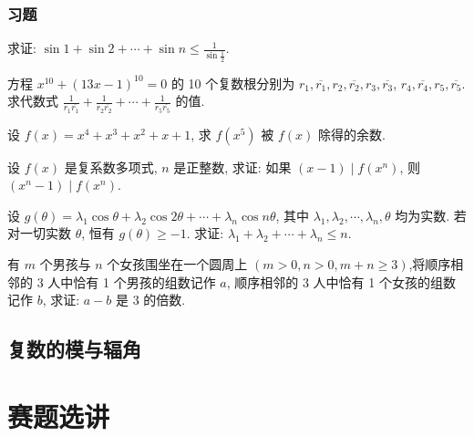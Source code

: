 \subsubsection{习题}
\begin{exercise}
	求证: $\sin 1+\sin 2+\cdots+\sin n \leqslant \frac{1}{\sin \frac{1}{2}}$.
\end{exercise}

\begin{exercise}
	方程 $x^{10}+(13 x-1)^{10}=0$ 的 10 个复数根分别为 $r_1, \overline{r_1}, r_2, \overline{r_2}, r_3, \overline{r_3}$, $r_4, \overline{r_4}, r_5, \overline{r_5}$. 求代数式 $\frac{1}{r_1 \overline{r_1}}+\frac{1}{r_2 \overline{r_2}}+\cdots+\frac{1}{r_5 \overline{r_5}}$ 的值.
\end{exercise}

\begin{exercise}
	设 $f(x)=x^4+x^3+x^2+x+1$, 求 $f\left(x^5\right)$ 被 $f(x)$ 除得的余数.
\end{exercise}

\begin{exercise}
	设 $f(x)$ 是复系数多项式, $n$ 是正整数, 求证: 如果 $(x-1) \mid f\left(x^n\right)$, 则 $\left(x^n-1\right) \mid f\left(x^n\right)$.
\end{exercise}

\begin{exercise}
	设 $g(\theta)=\lambda_1 \cos \theta+\lambda_2 \cos 2 \theta+\cdots+\lambda_n \cos n \theta$, 其中 $\lambda_1, \lambda_2, \cdots, \lambda_n, \theta$ 均为实数. 若对一切实数 $\theta$, 恒有 $g(\theta) \geqslant-1$. 求证: $\lambda_1+\lambda_2+\cdots+\lambda_n \leqslant n$.
\end{exercise}

\begin{exercise}
	有 $m$ 个男孩与 $n$ 个女孩围坐在一个圆周上 $(m>0, n>0, m+n \geqslant 3)$,将顺序相邻的 3 人中恰有 1 个男孩的组数记作 $a$, 顺序相邻的 3 人中恰有 1 个女孩的组数记作 $b$, 求证: $a-b$ 是 3 的倍数.
\end{exercise}
\subsection{复数的模与辐角}

\section{赛题选讲}